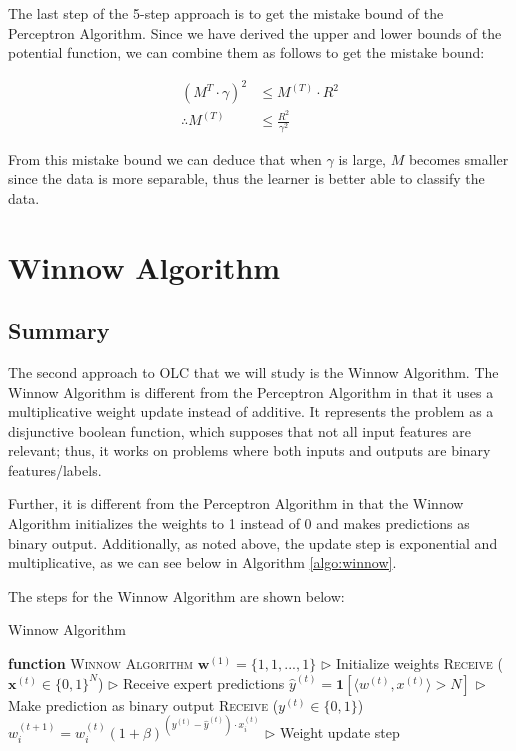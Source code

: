 \documentclass[11pt]{article}
\begin{document}
The last step of the 5-step approach is to get the mistake bound of the Perceptron Algorithm. Since we have derived the upper and lower bounds of the potential function, we can combine them as follows to get the mistake bound:

\begin{align}
    {(M^{T} \cdot \gamma)}^{2} &\leq 
    M^{(T)}\cdot R^2 \nonumber \\
    \therefore M^{(T)} &\leq \frac{R^{2}}{\gamma^{2}}
\end{align}

From this mistake bound we can deduce that when $\gamma$ is large, $M$ becomes smaller since the data is more separable, thus the learner is better able to classify the data. 

\section{Winnow Algorithm}

\subsection{Summary}

The second approach to OLC that we will study is the Winnow Algorithm. The Winnow Algorithm is different from the Perceptron Algorithm in that it uses a multiplicative weight update instead of additive. It represents the problem as a disjunctive boolean function, which supposes that not all input features are relevant; thus, it works on problems where both inputs and outputs are binary features/labels. 

Further, it is different from the Perceptron Algorithm in that the Winnow Algorithm initializes the weights to 1 instead of 0 and makes predictions as binary output. Additionally, as noted above, the update step is exponential and multiplicative, as we can see below in Algorithm \ref{algo:winnow}.

The steps for the Winnow Algorithm are shown below:

\begin{algorithm}[H]
\caption{Winnow Algorithm}
\label{algo:winnow}
\begin{algorithmic}[1]
\STATE \textbf{function} \textsc{Winnow Algorithm}
\STATE $\pmb{w}^{(1)} = \{1, 1, ..., 1\}$
\hfill $\triangleright$ Initialize weights
\STATE \textsc{Receive} ($\pmb{x}^{(t)} \in \{0, 1\}^N$) \hfill $\triangleright$ Receive expert predictions
\STATE $\hat{y}^{(t)} = \pmb{1}[\big\langle w^{(t)},  x^{(t)}\big\rangle > N]$ 
\hfill $\triangleright$ Make prediction as binary output
\STATE \textsc{Receive} ($y^{(t)}\in\{0, 1\}$)
\STATE $w_i^{(t+1)} = w_i^{(t)}(1 + \beta)^{(y^{(t)} - \hat{y}^{(t)}) \cdot x_i^{(t)}}$
\hfill $\triangleright$ Weight update step
\ENDFOR
\end{algorithmic}
\end{algorithm}
\end{document}
